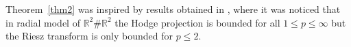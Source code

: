 \documentclass[12pt]{amsart}
\newcommand\R{\mathbb{R}}
\newcommand{\com}[1]{\vskip.3cm
	\fbox{%
		\color{red}
		\parbox{0.93\linewidth}{\footnotesize #1}}
	\vskip.3cm}
\newtheorem{theorem}{Theorem}[section]
\begin{document}
Theorem~\ref{thm2} was inspired by results obtained in \cite{HS1D}, where it was noticed that in radial model of $\R^2\#\R^2$ the Hodge projection is bounded for all $1 \le p \le \infty$ but 
the Riesz transform is only bounded for $p \le 2$.

 



\end{document}
